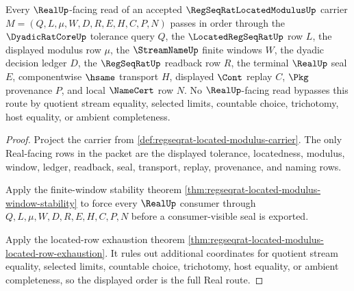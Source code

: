 \begin{theorem}
\label{thm:regseqrat-located-modulus-real-seal-route}
Every $\RealUp$-facing read of an accepted $\RegSeqRatLocatedModulusUp$ carrier $M=(Q,L,\mu,W,D,R,E,H,C,P,N)$ passes in order through the $\DyadicRatCoreUp$ tolerance query $Q$, the $\LocatedRegSeqRatUp$ row $L$, the displayed modulus row $\mu$, the $\StreamNameUp$ finite windows $W$, the dyadic decision ledger $D$, the $\RegSeqRatUp$ readback row $R$, the terminal $\RealUp$ seal $E$, componentwise $\hsame$ transport $H$, displayed $\Cont$ replay $C$, $\Pkg$ provenance $P$, and local $\NameCert$ row $N$. No $\RealUp$-facing read bypasses this route by quotient stream equality, selected limits, countable choice, trichotomy, host equality, or ambient completeness.
\end{theorem}
\begin{proof}
Project the carrier from \autoref{def:regseqrat-located-modulus-carrier}. The only Real-facing rows in the packet are the displayed tolerance, locatedness, modulus, window, ledger, readback, seal, transport, replay, provenance, and naming rows.

Apply the finite-window stability theorem \autoref{thm:regseqrat-located-modulus-window-stability} to force every $\RealUp$ consumer through $Q,L,\mu,W,D,R,E,H,C,P,N$ before a consumer-visible seal is exported.

Apply the located-row exhaustion theorem \autoref{thm:regseqrat-located-modulus-located-row-exhaustion}. It rules out additional coordinates for quotient stream equality, selected limits, countable choice, trichotomy, host equality, or ambient completeness, so the displayed order is the full Real route.
\end{proof}


\begin{closurestatus}{\RegSeqRatLocatedModulusUp}
  \theoryclosure{\seedClosure}
  \formalstatus{\unformalizedV}
\end{closurestatus}
